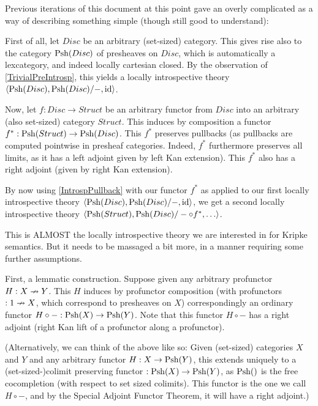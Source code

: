 Previous iterations of this document at this point gave an overly complicated as a way of describing something simple (though still good to understand):

First of all, let $Disc$ be an arbitrary (set-sized) category. This gives rise also to the category $\operatorname{Psh}(Disc)$ of presheaves on $Disc$, which is automatically a lexcategory, and indeed locally cartesian closed. By the observation of \cref{TrivialPreIntrosp}, this yields a locally introspective theory $\langle \operatorname{Psh}(Disc), \operatorname{Psh}(Disc)/-, \mathrm{id} \rangle$.

Now, let $f : Disc \to Struct$ be an arbitrary functor from $Disc$ into an arbitrary (also set-sized) category $Struct$. This induces by composition a functor $f^* : \operatorname{Psh}(Struct) \to \operatorname{Psh}(Disc)$. This $f^*$ preserves pullbacks (as pullbacks are computed pointwise in presheaf categories. Indeed, $f^*$ furthermore preserves all limits, as it has a left adjoint given by left Kan extension). This $f^*$ also has a right adjoint (given by right Kan extension).

By now using \cref{IntrospPullback} with our functor $f^*$ as applied to our first locally introspective theory $\langle \operatorname{Psh}(Disc), \operatorname{Psh}(Disc)/-, \mathrm{id} \rangle$, we get a second locally introspective theory $\langle \operatorname{Psh}(Struct), \operatorname{Psh}(Disc)/- \circ f^*, \ldots \rangle$.

This is ALMOST the locally introspective theory we are interested in for Kripke semantics. But it needs to be massaged a bit more, in a manner requiring some further assumptions. 

First, a lemmatic construction. Suppose given any arbitrary profunctor $H : X \nrightarrow Y$. This $H$ induces by profunctor composition (with profunctors $:1 \nrightarrow X$, which correspond to presheaves on $X$) correspondingly an ordinary functor $H \circ - : \operatorname{Psh}(X) \to \operatorname{Psh}(Y)$. Note that this functor $H \circ -$ has a right adjoint (right Kan lift of a profunctor along a profunctor).

(Alternatively, we can think of the above like so: Given (set-sized) categories $X$ and $Y$ and any arbitrary functor $H : X \to \operatorname{Psh}(Y)$, this extends uniquely to a (set-sized-)colimit preserving functor $: \operatorname{Psh}(X) \to \operatorname{Psh}(Y)$, as $\Psh$ is the free cocompletion (with respect to set sized colimits). This functor is the one we call $H \circ -$, and by the Special Adjoint Functor Theorem, it will have a right adjoint.)

